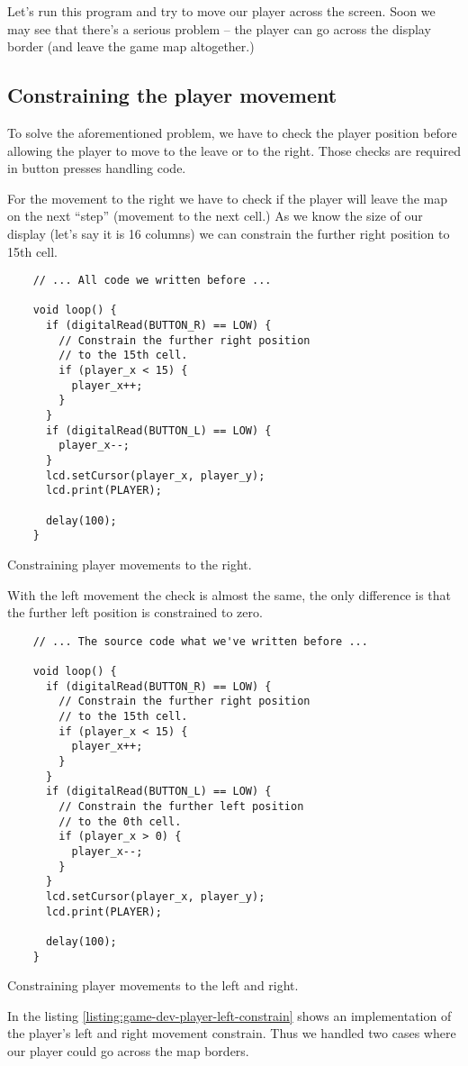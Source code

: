 \documentclass[../sparc.tex]{subfiles}
\begin{document}
Let's run this program and try to move our player across the screen.  Soon we
may see that there's a serious problem -- the player can go across the display
border (and leave the game map altogether.)

\subsection{Constraining the player movement}

To solve the aforementioned problem, we have to check the player position before
allowing the player to move to the leave or to the right.  Those checks are
required in button presses handling code.

For the movement to the right we have to check if the player will leave the map
on the next ``step'' (movement to the next cell.)  As we know the size of our
display (let's say it is 16 columns) we can constrain the further right position
to 15th cell.

\begin{listing}[H]
  \begin{verbatim}
    // ... All code we written before ...

    void loop() {
      if (digitalRead(BUTTON_R) == LOW) {
        // Constrain the further right position
        // to the 15th cell.
        if (player_x < 15) {
          player_x++;
        }
      }
      if (digitalRead(BUTTON_L) == LOW) {
        player_x--;
      }
      lcd.setCursor(player_x, player_y);
      lcd.print(PLAYER);

      delay(100);
    }
  \end{verbatim}
  \caption{Constraining player movements to the right.}
  \label{listing:game-dev-player-right--constrain}
\end{listing}

With the left movement the check is almost the same, the only difference is that
the further left position is constrained to zero.

\begin{listing}[ht]
  \begin{verbatim}
    // ... The source code what we've written before ...

    void loop() {
      if (digitalRead(BUTTON_R) == LOW) {
        // Constrain the further right position
        // to the 15th cell.
        if (player_x < 15) {
          player_x++;
        }
      }
      if (digitalRead(BUTTON_L) == LOW) {
        // Constrain the further left position
        // to the 0th cell.
        if (player_x > 0) {
          player_x--;
        }
      }
      lcd.setCursor(player_x, player_y);
      lcd.print(PLAYER);

      delay(100);
    }
  \end{verbatim}
  \caption{Constraining player movements to the left and right.}
  \label{listing:game-dev-player-left-constrain}
\end{listing}

In the listing \ref{listing:game-dev-player-left-constrain} shows an
implementation of the player's left and right movement constrain.  Thus we
handled two cases where our player could go across the map borders.
\end{document}
